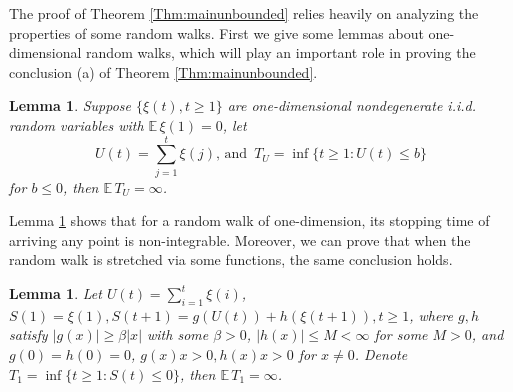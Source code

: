 \documentclass[11pt]{article}
\newtheorem{lem}[thm]{Lemma}
\theoremstyle{definition}
\theoremstyle{remark}
\numberwithin{equation}{section}
\begin{document}
The proof of Theorem \ref{Thm:mainunbounded} relies heavily on analyzing the properties of some random walks. First we give some lemmas about one-dimensional random walks, which will play an important role in proving the conclusion (a) of Theorem \ref{Thm:mainunbounded}.
\begin{lem}\cite{Chow1997}\label{Lem:Tboundedwalk}
Suppose $\{\xi(t), t\geq 1\}$ are one-dimensional nondegenerate i.i.d. random variables with $\mathbb{E}\,\xi(1)=0$, let
\begin{equation*}
  U(t)=\sum_{j=1}^t\xi(j),\,\text{and}\,\,\, T_U=\inf\{t\geq 1: U(t)\leq b\}
\end{equation*}
for $b\leq 0$, then $\mathbb{E}\,T_U=\infty$.
\end{lem}
Lemma \ref{Lem:Tboundedwalk} shows that for a random walk of one-dimension, its stopping time of arriving any point is non-integrable. Moreover, we can prove that when the random walk is stretched via some functions, the same conclusion holds.
\begin{lem}\label{Lem:Tgeneralrw}
Let $U(t)=\sum_{i=1}^{t}\xi(i)$, $S(1)=\xi(1), S(t+1)=g(U(t))+h(\xi(t+1)), t\geq 1$, where $g, h$ satisfy $|g(x)|\geq \beta|x|$ with some $\beta>0$, $|h(x)|\leq M<\infty$ for some $M>0$, and $g(0)=h(0)=0$, $g(x)x>0, h(x)x> 0$ for $x\neq 0$. Denote $T_1=\inf\{t\geq 1: S(t)\leq 0\}$, then $\mathbb{E}\,T_1=\infty$.
\end{lem}
\end{document}
